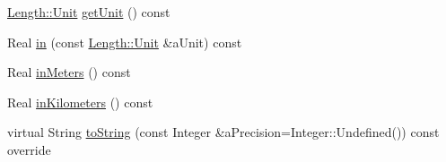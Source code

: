 \begin{DoxyCompactItemize}
\hyperlink{classostk_1_1physics_1_1units_1_1_length_a2664470a7eedf5d45c88861fe69badea}{Length\+::\+Unit} \hyperlink{classostk_1_1physics_1_1units_1_1_length_a91a1b3cecc897c3f39519b26f01c431b}{get\+Unit} () const
\item 
Real \hyperlink{classostk_1_1physics_1_1units_1_1_length_ac4e43b2af197223ef81240b432f5b5af}{in} (const \hyperlink{classostk_1_1physics_1_1units_1_1_length_a2664470a7eedf5d45c88861fe69badea}{Length\+::\+Unit} \&a\+Unit) const
\item 
Real \hyperlink{classostk_1_1physics_1_1units_1_1_length_aa2d544dc47f218e40c13f498c00ae067}{in\+Meters} () const
\item 
Real \hyperlink{classostk_1_1physics_1_1units_1_1_length_a433a4673829f129b765b11ddce6c88b6}{in\+Kilometers} () const
\item 
virtual String \hyperlink{classostk_1_1physics_1_1units_1_1_length_ad3ec518939d2ffc86cd73b8ed4c071af}{to\+String} (const Integer \&a\+Precision=Integer\+::\+Undefined()) const override
\end{DoxyCompactItemize}
